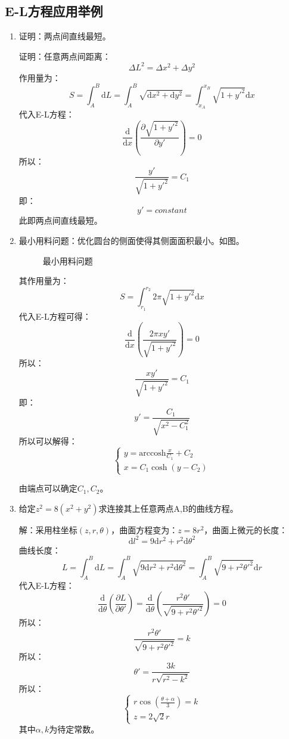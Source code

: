\subsection{E-L方程应用举例}

\begin{enumerate}
	\item 
		证明：两点间直线最短。
		
		证明：任意两点间距离：
		\[\Delta L^2 = \Delta x^2 + \Delta y^2\]
		作用量为：
		\[S = \int_{A}^{B} \mathrm{d}L = \int_{A}^{B} \sqrt{\mathrm{d}x^2+\mathrm{d}y^2} = \int_{x_A}^{x_B} \sqrt{1 + y'^2} \mathrm{d}x\]
		代入E-L方程：
		\[\frac{\mathrm{d}}{\mathrm{d}x} \left( \frac{\partial \sqrt{1 + y'^2}}{\partial y'} \right) = 0\]
		所以：
		\[\frac{y'}{\sqrt{1 + y'^2}} = C_1 \]
		即：
		\[y' = constant\]
		此即两点间直线最短。\\
	\item
		最小用料问题：优化圆台的侧面使得其侧面面积最小。如图。
		\begin{figure}
			\centering
			\caption{最小用料问题}
		\end{figure}
		其作用量为：
		\[S = \int_{r_1}^{r_2} 2\pi \sqrt{1+y'^2}\mathrm{d}x\]
		代入E-L方程可得：
		\[\frac{\mathrm{d}}{\mathrm{d}x} \left( \frac{2\pi x y'}{\sqrt{1+y'^2}} \right) = 0\]
		所以：
		\[\frac{x y'}{\sqrt{1+y'^2}} = C_1\]
		即：
		\[y' = \frac{C_1}{\sqrt{x^2-C_1^2}}\]
		所以可以解得：
		\begin{equation}
		\left\{
		\begin{array}{c}
		y = \mathrm{arccosh} \frac{x}{C_1} + C_2\\
		x= C_1 \cosh (y-C_2) 
		\end{array}
		\right.
		\end{equation}
		
		由端点可以确定$C_1,C_2$。
	\item
		给定$z^2 = 8(x^2+y^2)$求连接其上任意两点A,B的曲线方程。
		
		解：采用柱坐标$(z,r,\theta)$，曲面方程变为：$z=8r^2$，曲面上微元的长度：
		\[\mathrm{d}l^2 = 9\mathrm{d}r^2+r^2\mathrm{d}\theta^2\]
		曲线长度：
		\[L = \int_{A}^{B} \mathrm{d}L = \int_{A}^{B}\sqrt{9\mathrm{d}r^2+r^2\mathrm{d}\theta^2} = \int_{A}^{B}\sqrt{9+r^2\theta'^2}\mathrm{d}r\]
		代入E-L方程：
		\[\frac{\mathrm{d}}{\mathrm{d}\theta}\left( \frac{\partial L}{\partial \theta'} \right) = \frac{\mathrm{d}}{\mathrm{d}\theta}\left( \frac{r^2\theta'}{\sqrt{9+r^2\theta'^2}} \right) =0\]
		所以：
		\[\frac{r^2\theta'}{\sqrt{9+r^2\theta'^2}} = k\]
		所以：
		\[\theta' = \frac{3k}{r\sqrt{r^2-k^2}}\]
		所以：
		\begin{equation}
		\left\{
		\begin{array}{c}
		r\cos \left(\frac{\theta+\alpha}{3}\right) = k\\
		z = 2\sqrt{2}r
		\end{array}
		\right.
		\end{equation}
		其中$\alpha,k$为待定常数。
\end{enumerate}

